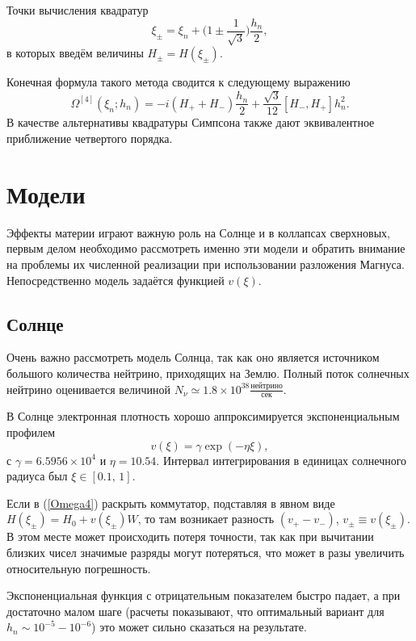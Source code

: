 \documentclass[12pt]{article}
\numberwithin{equation}{section}
\begin{document}
Точки вычисления квадратур
\begin{equation}
\xi_{\pm}=\xi_n+\bigl(1\pm\frac{1}{\sqrt{3}}\bigr)\frac{h_n}{2},
\end{equation} 
в которых введём величины $H_{\pm}=H(\xi_{\pm})$.

Конечная формула такого метода сводится к следующему выражению 
\begin{equation}
\label{Omega4}
\Omega^{[4]}(\xi_n;h_n)=-i(H_++H_-)\frac{h_n}{2}+\frac{\sqrt{3}}{12}[H_-,H_+]h^2_n.
\end{equation}
В качестве альтернативы квадратуры Симпсона также дают эквивалентное приближение четвертого порядка.

\section{Модели}

Эффекты материи играют важную роль на Солнце и в коллапсах сверхновых, первым делом необходимо рассмотреть именно эти модели и обратить внимание на проблемы их численной реализации при использовании разложения Магнуса. Непосредственно модель задаётся функцией $v(\xi)$.

\subsection{Солнце}

Очень важно рассмотреть модель Солнца, так как оно является источником большого количества нейтрино, приходящих на Землю. Полный поток солнечных нейтрино оценивается величиной $N_\nu\simeq 1.8 \times 10^{38} \frac{\text{нейтрино}}{\text{сек}}$.

В Солнце электронная плотность хорошо аппроксимируется экспоненциальным профилем
\begin{equation}
v(\xi)=\gamma \exp(-\eta\xi),
\end{equation}
с $\gamma=6.5956\times10^4$ и $\eta=10.54$. Интервал интегрирования в единицах солнечного радиуса был $\xi\in[0.1,\,1]$.

Если в (\ref{Omega4}) раскрыть коммутатор, подставляя в явном виде $H(\xi_\pm)=H_0+v(\xi_\pm)W$, то там возникает разность $(v_+-v_-)$, $v_\pm\equiv v(\xi_\pm)$. В этом месте может происходить потеря точности, так как при вычитании близких чисел значимые разряды могут потеряться, что может в разы увеличить относительную погрешность.

Экспоненциальная функция с отрицательным показателем быстро падает, а при достаточно малом шаге (расчеты показывают, что оптимальный вариант для $h_n\sim 10^{-5}-10^{-6}$) это может сильно сказаться на результате.
\end{document}

